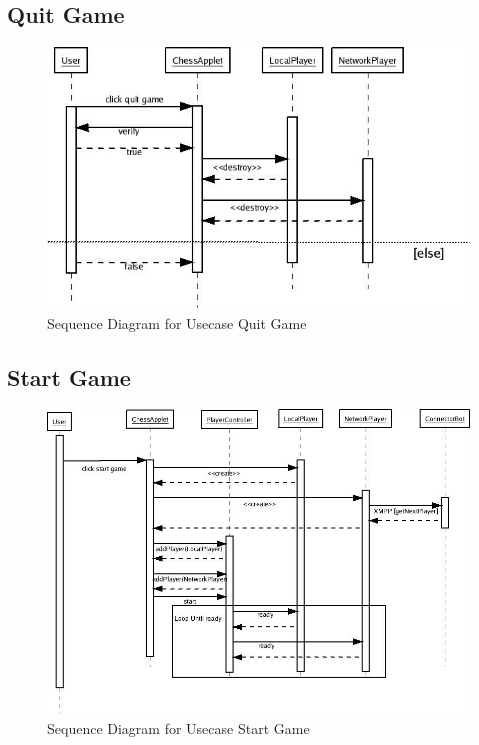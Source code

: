 \subsection{Quit Game}
\begin{figure}[H]
   \centering
   \includegraphics[scale=0.50]{seq_Quit_Game.jpg}
   \caption{Sequence Diagram for Usecase Quit Game}
  \end{figure}
\subsection{Start Game}
\begin{figure}[H]
   \centering
   \includegraphics[scale=0.50]{seq_Start_Game.jpeg}
   \caption{Sequence Diagram for Usecase Start Game}
  \end{figure}
